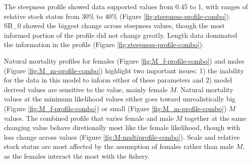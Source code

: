 \documentclass[11pt,
  english,
  a4paper,
]{article}
\begin{document}
\leavevmode\tagmcend\tagstructend\par


The steepness profile showed data supported values from 0.45 to 1, with ranges of relative stock status from 30\% to 40\% (Figure \ref{fig:steepness-profile-combo}). SB\_0 showed the biggest change across steepness values, though the most informed portion of the profile did not change greatly. Length data dominated the information in the profile (Figure \ref{fig:steepness-profile-combo}).

\leavevmode\tagmcend\tagstructend\par


Natural mortality profiles for females (Figure \ref{fig:M_f-profile-combo}) and males (Figure \ref{fig:M_m-profile-combo}) highlight two important issues: 1) the inability for the data in this model to inform either of these parameters and 2) model derived values are sensitive to the value, mainly female {\(M\)\leavevmode\tagmcend\tagstructend}. Natural mortality values at the minimum likelihood values either goes toward unrealistically big (Figure \ref{fig:M_f-profile-combo}) or small (Figure \ref{fig:M_m-profile-combo}) {\(M\)\leavevmode\tagmcend\tagstructend} values. The combined profile that varies female and male {\(M\)\leavevmode\tagmcend\tagstructend} together at the same changing value behave diretionally most like the female likelihood, though with less change across values (Figure \ref{fig:M-multiprofile-combo}). Scale and relative stock status are most affected by the assumption of females rather than male {\(M\)\leavevmode\tagmcend\tagstructend}, as the females interact the most with the fishery.

\leavevmode\tagmcend\tagstructend\par

\end{document}
